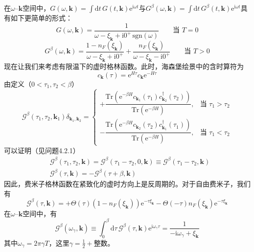 在$\omega$--$\pmb{k}$空间中，$G(\omega,\pmb{k})=\int\mathrm{d}t\, G(t,\pmb{k})\mathrm{e}^{\mathrm{i}\omega t}$与$G^{\beta}(\omega,\pmb{k})=\int\mathrm{d}t\, G^{\beta}(t,\pmb{k})\mathrm{e}^{\mathrm{i}\omega t}$具有如下更简单的形式：
\begin{equation*}
G(\omega,\pmb{k})=\frac{1}{\omega-\xi_{\pmb{k}}+\mathrm{i}0^{+}\,\mathrm{sgn}(\omega)}\qquad \text{当 } T=0\tag{4.2.4}
\end{equation*}
\begin{equation*}
G^{\beta}(\omega,\pmb{k})=\frac{1-n_F(\xi_{\pmb{k}})}{\omega-\xi_{\pmb{k}}+\mathrm{i}0^{+}}+\frac{n_F(\xi_{\pmb{k}})}{\omega-\xi_{\pmb{k}}-\mathrm{i}0^{+}}\qquad \text{当 } T>0\tag{4.2.5}
\end{equation*}
现在让我们来考虑有限温下的虚时格林函数。此时，海森堡绘景中的含时算符为
\begin{equation*}
c_{\pmb{k}}(\tau)=\mathrm{e}^{H\tau}c_{\pmb{k}}\mathrm{e}^{-H\tau}
\end{equation*}
由定义（$0<\tau_1,\tau_2<\beta$）
\begin{equation*}
\mathcal{G}^{\beta}(\tau_1,\tau_2,\pmb{k}_1)\delta_{\pmb{k}_1,\pmb{k}_2}
=\begin{cases}
+\dfrac{\mathrm{Tr}(\mathrm{e}^{-\beta H}c_{\pmb{k}_1}(\tau_1)c_{\pmb{k}_2}^{\dagger}(\tau_2))}{\mathrm{Tr}(\mathrm{e}^{-\beta H})}, & \text{当 } \tau_1>\tau_2\\[10pt]
-\dfrac{\mathrm{Tr}(\mathrm{e}^{-\beta H}c_{\pmb{k}_2}(\tau_2)c_{\pmb{k}_1}^{\dagger}(\tau_1))}{\mathrm{Tr}(\mathrm{e}^{-\beta H})}, & \text{当 } \tau_1<\tau_2
\end{cases}\tag{4.2.6}
\end{equation*}
可以证明（见问题4.2.1）
\begin{align*}
&\mathcal{G}^{\beta}(\tau_1,\tau_2,\pmb{k})=\mathcal{G}^{\beta}(\tau_1-\tau_2,0,\pmb{k})\equiv\mathcal{G}^{\beta}(\tau_1-\tau_2,\pmb{k})\\
&\mathcal{G}^{\beta}(\tau,\pmb{k})=-\mathcal{G}^{\beta}(\tau+\beta,\pmb{k})\tag{4.2.7}
\end{align*}
因此，费米子格林函数在紧致化的虚时方向上是反周期的。对于自由费米子，我们有
\begin{equation*}
\mathcal{G}^{\beta}(\tau,\pmb{k})=+\Theta(\tau)(1-n_F(\xi_{\pmb{k}}))\mathrm{e}^{-\tau\xi_{\pmb{k}}}-\Theta(-\tau)n_F(\xi_{\pmb{k}})\mathrm{e}^{-\tau\xi_{\pmb{k}}}\tag{4.2.8}
\end{equation*}
在$\omega$--$\pmb{k}$空间中，有
\begin{equation*}
\mathcal{G}^{\beta}(\omega_{\gamma},\pmb{k})\equiv\int_{0}^{\beta}\mathrm{d}\tau\, \mathcal{G}^{\beta}(\tau,\pmb{k})\mathrm{e}^{\mathrm{i}\omega_{\gamma}\tau}=\frac{1}{-\mathrm{i}\omega_{\gamma}+\xi_{\pmb{k}}}\tag{4.2.9}
\end{equation*}
其中$\omega_{\gamma}=2\pi\gamma T$，这里$\gamma=\frac{1}{2}+$整数。

